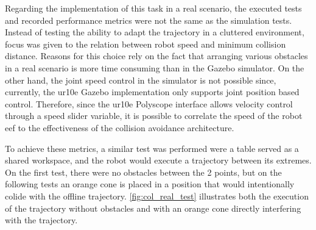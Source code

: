 \par Regarding the implementation of this task in a real scenario, the executed tests and recorded performance metrics were not the same as the simulation tests. Instead of testing the ability to adapt the trajectory in a cluttered environment, focus was given to the relation between robot speed and minimum collision distance. Reasons for this choice rely on the fact that arranging various obstacles in a real scenario is more time consuming than in the Gazebo simulator. On the other hand, the joint speed control in the simulator is not possible since, currently, the \ac{ur10e} Gazebo implementation only supports joint position based control. Therefore, since the \ac{ur10e} Polyscope interface allows velocity control through a speed slider variable, it is possible to correlate the speed of the robot \ac{eef} to the effectiveness of the collision avoidance architecture.

\par To achieve these metrics, a similar test was performed were a table served as a shared workspace, and the robot would execute a trajectory between its extremes. On the first test, there were no obstacles between the 2 points, but on the following tests an orange cone is placed in a position that would intentionally colide with the offline trajectory. \autoref{fig:col_real_test} illustrates both the execution of the trajectory without obstacles and with an orange cone directly interfering with the trajectory.

